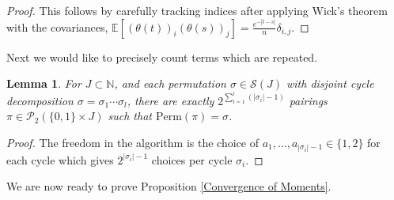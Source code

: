 \documentclass{amsart}
\newtheorem{lm}[thm]{Lemma}
\numberwithin{equation}{section}
\newcommand{\E}{\mathbb{E}}
\begin{document}
\begin{proof}
    This follows by carefully tracking indices after applying Wick's theorem with the covariances, $\E[(\theta(t))_i(\theta(s))_j] = \frac{e^{-|t-s|}}{n} \delta_{i,j}$.
\end{proof}

Next we would like to precisely count terms which are repeated. 
\begin{lm}\label{Multiplicity of Perm}
    For $J \subset \mathbb{N}$, and each permutation $\sigma \in \mathcal{S}(J)$ with disjoint cycle decomposition $\sigma = \sigma_1\cdots\sigma_l$, there are exactly $2^{\sum_{i=1}^{l}(|\sigma_i|-1)}$ pairings $\pi \in \mathcal{P}_2(\{0,1\} \times J)$ such that $\mathrm{Perm}(\pi) = \sigma$.
\end{lm}

\begin{proof}
    The freedom in the algorithm is the choice of $a_1,\dots ,a_{|\sigma_i|-1} \in \{1,2\}$ for each cycle which gives $2^{|\sigma_i|-1}$ choices per cycle $\sigma_i$.
\end{proof}

We are now ready to prove Proposition \ref{Convergence of Moments}.
\end{document}
